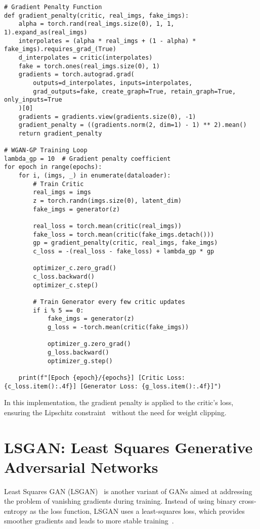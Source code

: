\begin{lstlisting}[style=python]
# Gradient Penalty Function
def gradient_penalty(critic, real_imgs, fake_imgs):
    alpha = torch.rand(real_imgs.size(0), 1, 1, 1).expand_as(real_imgs)
    interpolates = (alpha * real_imgs + (1 - alpha) * fake_imgs).requires_grad_(True)
    d_interpolates = critic(interpolates)
    fake = torch.ones(real_imgs.size(0), 1)
    gradients = torch.autograd.grad(
        outputs=d_interpolates, inputs=interpolates,
        grad_outputs=fake, create_graph=True, retain_graph=True, only_inputs=True
    )[0]
    gradients = gradients.view(gradients.size(0), -1)
    gradient_penalty = ((gradients.norm(2, dim=1) - 1) ** 2).mean()
    return gradient_penalty

# WGAN-GP Training Loop
lambda_gp = 10  # Gradient penalty coefficient
for epoch in range(epochs):
    for i, (imgs, _) in enumerate(dataloader):
        # Train Critic
        real_imgs = imgs
        z = torch.randn(imgs.size(0), latent_dim)
        fake_imgs = generator(z)
        
        real_loss = torch.mean(critic(real_imgs))
        fake_loss = torch.mean(critic(fake_imgs.detach()))
        gp = gradient_penalty(critic, real_imgs, fake_imgs)
        c_loss = -(real_loss - fake_loss) + lambda_gp * gp

        optimizer_c.zero_grad()
        c_loss.backward()
        optimizer_c.step()

        # Train Generator every few critic updates
        if i % 5 == 0:
            fake_imgs = generator(z)
            g_loss = -torch.mean(critic(fake_imgs))

            optimizer_g.zero_grad()
            g_loss.backward()
            optimizer_g.step()

    print(f"[Epoch {epoch}/{epochs}] [Critic Loss: {c_loss.item():.4f}] [Generator Loss: {g_loss.item():.4f}]")
\end{lstlisting}

In this implementation, the gradient penalty is applied to the critic's loss, ensuring the Lipschitz constraint~\cite{li2019preventing} without the need for weight clipping.

\section{LSGAN: Least Squares Generative Adversarial Networks}
Least Squares GAN (LSGAN)~\cite{mao2017least} is another variant of GANs aimed at addressing the problem of vanishing gradients during training. Instead of using binary cross-entropy as the loss function, LSGAN uses a least-squares loss, which provides smoother gradients and leads to more stable training~\cite{lee2022least}.

